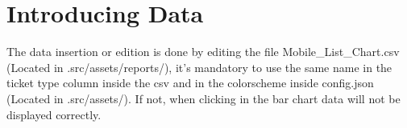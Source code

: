 \documentclass[12pt]{article}
\begin{document}
\section{Introducing Data} %
The data insertion or edition is done by editing the file Mobile\_List\_Chart.csv (Located in .src/assets/reports/), it's mandatory to use the same name in the ticket type column 
inside the csv and in the colorscheme inside config.json (Located in .src/assets/). If not, when clicking in the bar chart data will not be displayed correctly.\par
\end{document}
